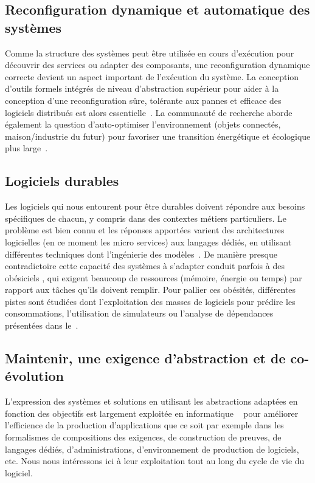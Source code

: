 \documentclass[11pt]{article}
\newcommand{\defi}[1]{\cite[défi]{#1}}
\begin{document}
\subsection{Reconfiguration dynamique et automatique des systèmes \label{ss:maintenance:reconfiguration}}
Comme la structure des systèmes peut être utilisée en cours d'exécution pour découvrir des services ou adapter des composants, une reconfiguration dynamique correcte devient un aspect important de l'exécution du système. La conception d'outils formels intégrés de niveau d'abstraction supérieur pour aider à la conception d'une reconfiguration sûre, tolérante aux pannes et efficace des logiciels distribués est alors essentielle~\defi{reconfiguration}. 
La communauté de recherche aborde  également la question d’auto-optimiser 
l'environnement (objets connectés, maison/industrie du futur)
pour favoriser une transition énergétique et écologique plus large~\defi{vert}.


\subsection{Logiciels durables\label{ss:maintenance:vert}}
Les logiciels qui nous entourent pour être durables doivent répondre aux besoins spécifiques de chacun, y compris dans des contextes métiers particuliers. Le problème est bien connu et les réponses apportées varient des architectures logicielles (en ce moment les micro services) aux langages dédiés, en utilisant différentes techniques dont l'ingénierie des modèles~\defi{coevolution}. 
De manière presque contradictoire 
cette capacité des systèmes à s’adapter conduit parfois à des
\og obésiciels \fg, qui exigent beaucoup de ressources (mémoire, énergie ou temps) par rapport aux tâches qu'ils doivent remplir. Pour pallier ces obésités, 
différentes pistes sont étudiées dont l'exploitation des masses de logiciels pour prédire les consommations, l'utilisation de simulateurs ou l'analyse de dépendances présentées dans le~\defi{vert}.

\subsection{Maintenir, une exigence d'abstraction et de co-évolution\label{ss:maintenance:abstractions}}
L'expression des systèmes et solutions en utilisant les abstractions adaptées en fonction des objectifs est largement exploitée en informatique ~\cite{DBLP:journals/sigcse/Gurer02} pour améliorer l'efficience de la production d'applications que ce soit par exemple dans les formalismes de compositions des exigences, de construction de preuves, de langages dédiés, d'administrations, d'environnement de production de logiciels, etc. Nous nous intéressons ici à leur exploitation tout au long du cycle de vie du logiciel.
\end{document}
